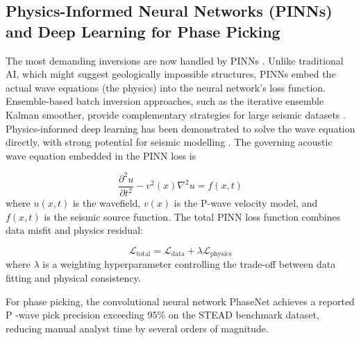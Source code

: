 \documentclass[data,article,accept,pdftex,moreauthors]{Definitions/mdpi}
\begin{document}
\subsection{Physics-Informed Neural Networks (PINNs) and Deep Learning for Phase Picking}

The most demanding inversions are now handled by PINNs \cite{song2022versatile}. Unlike traditional AI, which might suggest geologically impossible structures, PINNs embed the actual wave equations (the physics) into the neural network's loss function. Ensemble-based batch inversion approaches, such as the iterative ensemble Kalman smoother, provide complementary strategies for large seismic datasets \cite{Gineste2021}. Physics-informed deep learning has been demonstrated to solve the wave equation directly, with strong potential for seismic modelling \cite{Moseley2020}. The governing acoustic wave equation embedded in the PINN loss is

\begin{equation}
\frac{\partial^2 u}{\partial t^2} - v^2(x%
)\nabla^2 u = f(x, t)
\end{equation}
where $u(x,t)$ is the wavefield, $v(x)$ is the P-wave velocity model, and $f(x,t)$ is the seismic source function. The total PINN loss function combines data misfit and physics residual:

\begin{equation}
\mathcal{L}_{\text{total}} = \mathcal{L}_{\text{data}} + \lambda \mathcal{L}_{\text{physics}}
\end{equation}
where $\lambda$ is a weighting hyperparameter controlling the trade-off between data fitting and physical consistency.

For phase picking, the convolutional neural network PhaseNet %
 achieves a reported P%
-wave pick precision exceeding 95\% on the STEAD benchmark dataset, reducing manual analyst time by several orders of magnitude.
\end{document}
